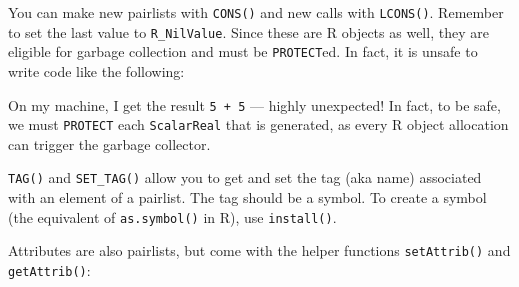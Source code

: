 You can make new pairlists with \texttt{CONS()} and new calls with
\texttt{LCONS()}. Remember to set the last value to
\texttt{R\_NilValue}. Since these are R objects as well, they are
eligible for garbage collection and must be \texttt{PROTECT}ed. In fact,
it is unsafe to write code like the following:

\begin{Shaded}
\begin{Highlighting}[]
\StringTok{ }\NormalTok{(}\NormalTok{, }
\StringTok{    )}
\StringTok{  ));}
\NormalTok{)}
\NormalTok{(}\NormalTok{)}
\NormalTok{()}
\NormalTok{(}\NormalTok{)}
\end{Highlighting}
\end{Shaded}

On my machine, I get the result \texttt{5 + 5} --- highly unexpected! In
fact, to be safe, we must \texttt{PROTECT} each \texttt{ScalarReal} that
is generated, as every R object allocation can trigger the garbage
collector.

\begin{Shaded}
\begin{Highlighting}[]
\StringTok{ }\NormalTok{(}\NormalTok{, }
\StringTok{    )}
\StringTok{  )));}
\NormalTok{)}
\NormalTok{(}\NormalTok{)}
\NormalTok{()}
\NormalTok{(}\NormalTok{)}
\end{Highlighting}
\end{Shaded}

\texttt{TAG()} and \texttt{SET\_TAG()} allow you to get and set the tag
(aka name) associated with an element of a pairlist. The tag should be a
symbol. To create a symbol (the equivalent of \texttt{as.symbol()} in
R), use \texttt{install()}.

Attributes are also pairlists, but come with the helper functions
\texttt{setAttrib()} and \texttt{getAttrib()}:

